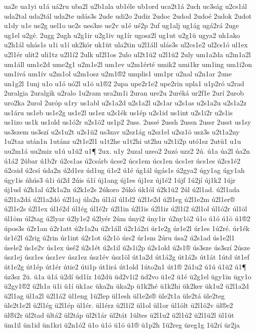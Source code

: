 {ua2e
ua1yi
u1á
uá2ru
uba2l
u2b1ala
ub1éle
ub1ord
uca2t1á
2uch
uc3ság
u2cs1ál
uda2tal
uda2tál
uda2te
udás3s
2ude
udi2o
2udiz
2udoc
2udod
2udoé
2udok
2udot
u1dy
u1e
ue2g
uel1o
ue2s
ues3ze
ue2v
u1é
ué2p
2uf
ug1alj
ug1ág
ugá2rá
2uge
ug1el
u2gé.
2ugg
2ugh
u2g1ir
u2g1iv
ug1ír
ugosz2l
ug1ut
u2g1ü
ugya2
uh1ako
u2h1ál
uhás1s
u1i
u1í
uk2kór
uk1üt
ula2tin
u2l1áll
ulás3s
ul2cs1e2
ul2cs1ó
ul1ex
u2l1ér
ulit2
uli1tz
u2l1í2
2ulk
ul2l1os
2ulo
ul2t1ü2
u2l1ü2
2uly
um1a2da
u2m1a2l
um1áll
um1e2d
ume2g1
u2m1e2l
um1ev
u2m1érté
umik2
umi1kr
um1ing
um1i2on
um1ivá
um1ív
u2m1ol
u2m1osz
u2m1®2
umplis1
um1pr
u2nal
u2n1ar
2une
un1g2l
1unj
u1o
u1ó
uó2l
u1ö
u1®2
2upa
upe2r1e2
upe2rin
upla1
u1p2ró
u2rad
2uralgia
2uralgik
u2ralo
1u2ram
ura2m1i
2uran
ure2u
2uréká
ur2f1e
2urí
2urob
uro2ka
2urol
2uróp
u1ry
us1abl
u2s1a2d
u2s1a2l
u2s1ar
u2s1as
u2s1a2u
u2s1a2z
us1áru
us1eb
us1e2g
us1e2l
us1ez
u2s1ék
us1ép
u2s1id
us1int
u2s1i2r
u2s1is
us1izo
us1k
us1old
us1ó2r
u2s1ö2
us1p2
2uss.
2ussé
2ussh
2ussn
2ussr
2usst
us1sy
us3szem
us3szí
u2s1u2t
u2s1ü2
us3zav
u2sz1ág
u2sz1el
u2sz1ö
usz3s
u2t1a2ny
1u2taz
után1n
1utánz
u2t1e2l1
u1t2he
u1t2hi
ut2hu
u2t1i2p
utó1sz
2utü1
u1u
uu2m1á
uu2miz
u1ú
u1ü2
u1¶
2ux.
u1y
2uzal
uzeo2
2uzó
uzz2
2ú.
ú1a
úa2l
úa2n
ú1á2
2úbar
ú1b2r
ú2cs1as
ú2csárb
úcse2
úcs1em
úcs1en
úcs1er
úcs1es
ú2cs1é2
ú2csid
ú2csí
úda2n
ú2d1ez
úd1ug
ú1e2
ú1é
úg1ál
úgás1s
ú2gya2
úgy1ag
úgy1ah
úgy1is
úhús3
ú1i
úi2d
2úis
ú1í
új1ang
új1es
új1ez
új1é2
1újf
1ú2jí
új1k2
1újr
új1ud
ú2k1al
ú2k1a2n
ú2k1e2s
2úkoro
2úkó
úk1ól
ú2k1ü2
2úl
ú2l1ad.
ú2l1ada
ú2l1a2dá
ú2l1a2dó
ú2l1aj
úla2n
úl1ál
úl1d2
ú2l1e2d
ú2l1eg
ú2l1e2m
ú2l1er®
ú2l1e2s
ú2l1ex
úl1é2d
úl1ég
úl1é2r
ú2l1in
ú2l1is
ú2l1iz
ú2l1í2
ú2l1ol
úl1ó2r
úl1öl
úl1öm
úl2tag
ú2lyar
ú2ly1e2
ú2lyér
2úm
únyi2
úny1ir
ú2ny1ö2
ú1o
ú1ó
ú1ö
ú1®2
úpos3s
ú2r1an
ú2r1att
ú2r1a2u
ú2r1áll
ú2r1á2ri
úr1e2g
úr1e2l
úr1es
1ú2ré.
úr1ék
úr1é2l
ú2rig
ú2rin
úr1int
ú2r1ot
ú2r1ö
úrs2
úr1sm
2úru
úsa2
ú2s1ad
ús1e2l1
úsele2
ús1e2v
ús1ex
úsé2
ú2s1ét
ú2s1il
ú2s1i2p
ú2s1old
ú2s1®
ús3sze
ús3szí
2úsze
úsz1ej
úsz1es
úsz1ev
úsz1ez
úsz1év
úsz1öl
út1a2d
út1á2g
út1á2s
út1át
1útd
út1ef
út1e2g
út1ép
út1ér
útie2
úti1p
út1irá
út1old
1úto2n1
út1®
2ú1u2
ú1ú
ú1ü2
ú1¶
úz3sz
2ü.
ü1a
ü1á
ü2dí
üd1íz
1ü2dü
üd2v1i2
üd2vo
ü1e2
ü1é
ü2g1el
ügy1in
ügy1o
ü2gy1®2
ü2h1a
ü1i
ü1í
ük1ac
üka2n
üka2p
ü1k2hé
ü1k2hi
ük2ker
ük1u2
ü2l1a2d
ü2l1ag
ül1a2l
ü2l1á2
ül1eng
1ü2lep
ül1esh
ül1e2s®
üle2t1a
üle2tá
üle2teg
üle2t1e2l
ü2l1ég
ü2l1ép
ül1ér.
ül1érz
ü2l1í2
ül1ol
ül1or
ül1ölt
ü2l1ö2v
ül®e2
ül®i2r
ül2tad
ültá2
ül2táp
ül2t1ár
ül2tát
1ültes
ü2l1u2
ü2l1ú2
ü2l1ü2l
ül1üt
üm1il
ün1id
ün1kri
ü2n1ó2
ü1o
ü1ó
ü1ö
ü1®
ü1p2h
1ü2reg
üreg1g
1ü2rí
ür2ja
}
